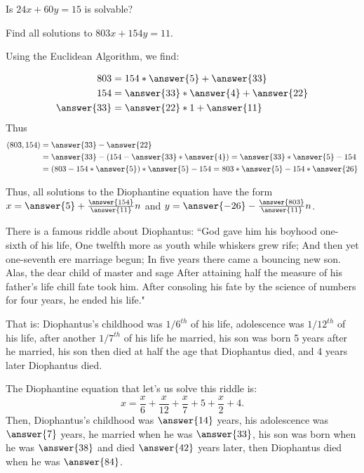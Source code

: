 \documentclass{../ximera}
\begin{document}
   \begin{example}
   Is $24x+60y=15$ is solvable?
   \begin{multipleChoice}
   \end{multipleChoice}
   \end{example}
    
   \begin{example}
   Find all solutions to $803x+154y=11$.
    
   Using the Euclidean Algorithm, we find:
     
   \begin{align*}
    803&=154*\answer{5}+\answer{33}\\
    154&=\answer{33}*\answer{4}+\answer{22}\\
    \answer{33}&=\answer{22}*1+\answer{11}
   \end{align*}
   Thus
   \begin{align*}
    (803,154)&=\answer{33}-\answer{22}\\
    &=\answer{33}-(154-\answer{33}*\answer{4})=\answer{33}*\answer{5}-154\\
    &=(803-154*\answer{5})*\answer{5}-154=803*\answer{5}-154*\answer{26}
   \end{align*}
    
   Thus, all solutions to the Diophantine equation have the form $x=\answer{5}+\frac{\answer{154}}{\answer{11}}n$ and $y=\answer{-26}-\frac{\answer{803}}{\answer{11}}n$.
   \end{example}
    
   \begin{example}
        There is a famous riddle about Diophantus: ``God gave him his boyhood one-sixth of his life, One twelfth more as youth while whiskers grew rife; And then yet one-seventh ere marriage begun; In five years there came a bouncing new son. Alas, the dear child of master and sage After attaining half the measure of his father's life chill fate took him. After consoling his fate by the science of numbers for four years, he ended his life."
     
        That is: Diophantus's childhood was $1/6^{th}$ of his life, adolescence was $1/12^{th}$ of his life, after another $1/7^{th}$ of his life he married, his son was born 5 years after he married, his son then died at half the age that Diophantus died, and 4 years later Diophantus died.
     
        The Diophantine equation that let's us solve this riddle is: 
            \[
                x=\frac{x}{6}+\frac{x}{12}+\frac{x}{7}+5+\frac{x}{2}+4.
            \] 
        Then, Diophantus's childhood was $\answer{14}$ years, his adolescence was $\answer{7}$ years, he married when he was $\answer{33}$, his son was born when he was $\answer{38}$ and died $\answer{42}$ years later, then Diophantus died when he was $\answer{84}$.
   \end{example}
   
\end{document}
